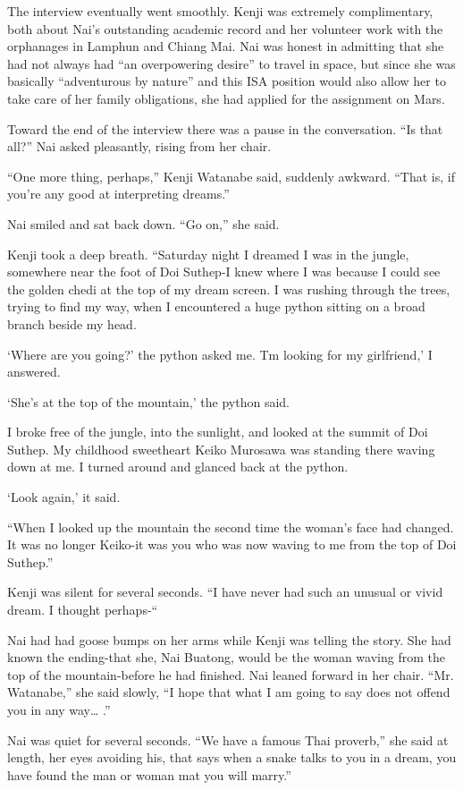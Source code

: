 \documentclass[]{article}
\begin{document}
{The interview eventually went smoothly.  Kenji was extremely complimentary, both about Nai’s outstanding academic record and her volunteer work with the orphanages in Lamphun and Chiang Mai.  Nai was honest in admitting that she had not always had “an overpowering desire” to travel in space, but since she was basically “adventurous by nature” and this ISA position would also allow her to take care of her family obligations, she had applied for the assignment on Mars.

Toward the end of the interview there was a pause in the conversation.  “Is that all?” Nai asked pleasantly, rising from her chair.

“One more thing, perhaps,” Kenji Watanabe said, suddenly awkward.  “That is, if you’re any good at interpreting dreams.”

Nai smiled and sat back down.  “Go on,” she said.

Kenji took a deep breath.  “Saturday night I dreamed I was in the jungle, somewhere near the foot of Doi Suthep-I knew where I was because I could see the golden chedi at the top of my dream screen.  I was rushing through the trees, trying to find my way, when I encountered a huge python sitting on a broad branch beside my head.

‘Where are you going?’ the python asked me.  Tm looking for my girlfriend,’ I answered.

‘She’s at the top of the mountain,’ the python said.

I broke free of the jungle, into the sunlight, and looked at the summit of Doi Suthep.  My childhood sweetheart Keiko Murosawa was standing there waving down at me.  I turned around and glanced back at the python.

‘Look again,’ it said.

“When I looked up the mountain the second time the woman’s face had changed.  It was no longer Keiko-it was you who was now waving to me from the top of Doi Suthep.”

Kenji was silent for several seconds.  “I have never had such an unusual or vivid dream.  I thought perhaps-“

Nai had had goose bumps on her arms while Kenji was telling the story.  She had known the ending-that she, Nai Buatong, would be the woman waving from the top of the mountain-before he had finished.  Nai leaned forward in her chair.  “Mr.  Watanabe,” she said slowly, “I hope that what I am going to say does not offend you in any way… .”

Nai was quiet for several seconds.  “We have a famous Thai proverb,” she said at length, her eyes avoiding his, that says when a snake talks to you in a dream, you have found the man or woman mat you will marry.”

}
\end{document}
